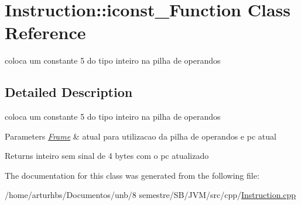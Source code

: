 \hypertarget{classInstruction_1_1iconst__5Function}{}\section{Instruction\+:\+:iconst\+\_\+Function Class Reference}
\label{classInstruction_1_1iconst__5Function}


coloca um constante 5 do tipo inteiro na pilha de operandos  




\subsection{Detailed Description}
coloca um constante 5 do tipo inteiro na pilha de operandos 


\begin{DoxyParams}{Parameters}
{\em \hyperlink{classFrame}{Frame}} & atual para utilizacao da pilha de operandos e pc atual \\
\hline
\end{DoxyParams}
\begin{DoxyReturn}{Returns}
inteiro sem sinal de 4 bytes com o pc atualizado 
\end{DoxyReturn}


The documentation for this class was generated from the following file\+:\begin{DoxyCompactItemize}
\item 
/home/arturhbs/\+Documentos/unb/8 semestre/\+S\+B/\+J\+V\+M/src/cpp/\hyperlink{Instruction_8cpp}{Instruction.\+cpp}\end{DoxyCompactItemize}
